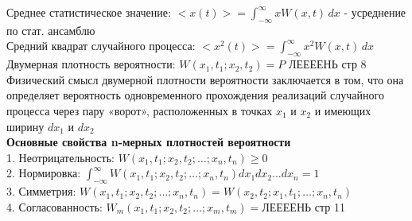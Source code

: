 \begin{multicols*}{2}
		Среднее статистическое значение: $<x(t)> = \int_{-\infty}^{\infty} x W(x,t) \,dx$ - усреднение по стат. ансамблю\\
		Средний квадрат случайного процесса: $<x^2(t)> = \int_{-\infty}^{\infty} x^2 W(x,t) \,dx$\\

		Двумерная плотность вероятности: $W(x_1,t_1; x_2,t_2) = P$ ЛЕЕЕЕНЬ стр 8 \\
		Физический смысл двумерной плотности вероятности заключается в том, что она определяет вероятность одновременного прохождения реализаций случайного процесса через пару «ворот», расположенных в точках $x_1$ и $x_2$ и имеющих ширину $dx_1$ и $dx_2$\\

		\textbf{Основные свойства n-мерных плотностей вероятности}\\
		1. Неотрицательность: $W(x_1, t_1; x_2, t_2;\ldots; x_n, t_n) \geqslant 0$\\
		2. Нормировка: $\int_{-\infty}^{\infty} W(x_1, t_1; x_2, t_2;\ldots; x_n, t_n)dx_1 dx_2 \ldots dx_n = 1$\\
		3. Симметрия: $W(x_1, t_1; x_2, t_2;\ldots; x_n, t_n) = W(x_2, t_2; x_1, t_1;\ldots; x_n, t_n)$\\
		4. Согласованность: $W_m(x_1, t_1; x_2, t_2;\ldots; x_m, t_m) =$ЛЕЕЕЕНЬ стр 11
		
	\end{multicols*}

